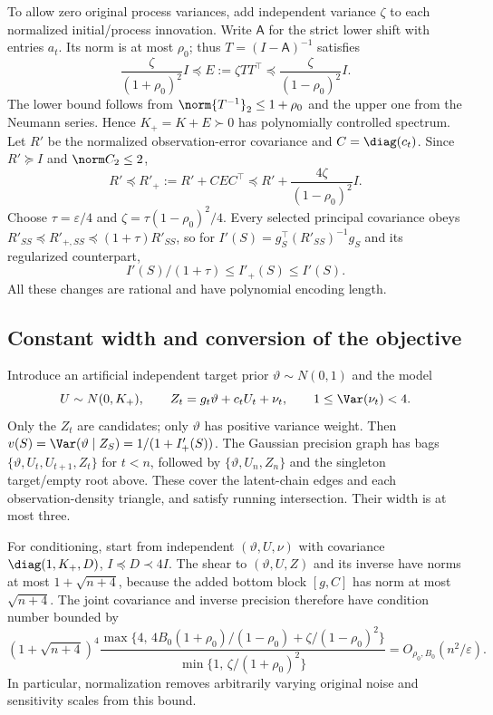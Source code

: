 To allow zero original process variances, add independent variance $\zeta$
to each normalized initial/process innovation. Write $\mathsf A$ for the
strict lower shift with entries $a_t$. Its norm is at most $\rho_0$; thus
$T=(I-\mathsf A)^{-1}$ satisfies
\[
 \frac{\zeta}{(1+\rho_0)^2}I\preceq E:=\zeta TT^\top
       \preceq\frac{\zeta}{(1-\rho_0)^2}I.
\]
The lower bound follows from $\norm{T^{-1}}_2\le1+\rho_0$ and the upper
one from the Neumann series. Hence $K_+=K+E\succ0$ has polynomially
controlled spectrum. Let $R'$ be the normalized observation-error covariance
and $C=\diag(c_t)$. Since $R'\succeq I$ and $\norm C_2\le2$,
\[
 R'\preceq R'_+:=R'+CEC^\top
 \preceq R'+\frac{4\zeta}{(1-\rho_0)^2}I.
\]
Choose $\tau=\varepsilon/4$ and
$\zeta=\tau(1-\rho_0)^2/4$. Every selected principal covariance obeys
$R'_{SS}\preceq R'_{+,SS}\preceq(1+\tau)R'_{SS}$, so for
$I'(S)=g_S^\top(R'_{SS})^{-1}g_S$ and its regularized counterpart,
\begin{equation}
 I'(S)/(1+\tau)\le I'_+(S)\le I'(S).
 \label{eq:gmrf-regularization}
\end{equation}
All these changes are rational and have polynomial encoding length.

\subsection{Constant width and conversion of the objective}
Introduce an artificial independent target prior $\vartheta\sim N(0,1)$
and the model
\[
 U\sim N(0,K_+),\qquad Z_t=g_t\vartheta+c_tU_t+\nu_t,
 \qquad 1\le\Var(\nu_t)<4.
\]
Only the $Z_t$ are candidates; only $\vartheta$ has positive variance weight.
Then $v(S)=\Var(\vartheta\mid Z_S)=1/(1+I'_+(S))$. The Gaussian precision
graph has bags $\{\vartheta,U_t,U_{t+1},Z_t\}$ for $t<n$, followed by
$\{\vartheta,U_n,Z_n\}$ and the singleton target/empty root above.
These cover the latent-chain edges and each observation-density triangle,
and satisfy running intersection. Their width is at most three.

For conditioning, start from independent $(\vartheta,U,\nu)$ with covariance
$\diag(1,K_+,D)$, $I\preceq D\prec4I$. The shear to
$(\vartheta,U,Z)$ and its inverse have norms at most
$1+\sqrt{n+4}$, because the added bottom block $[g,C]$ has norm at most
$\sqrt{n+4}$. The joint covariance and inverse precision therefore have
condition number bounded by
\begin{equation}
 (1+\sqrt{n+4})^4
 \frac{\max\{4,\,4B_0(1+\rho_0)/(1-\rho_0)
                       +\zeta/(1-\rho_0)^2\}}
      {\min\{1,\,\zeta/(1+\rho_0)^2\}}
 =O_{\rho_0,B_0}(n^2/\varepsilon).
 \label{eq:gmrf-condition}
\end{equation}
In particular, normalization removes arbitrarily varying original noise and
sensitivity scales from this bound.

